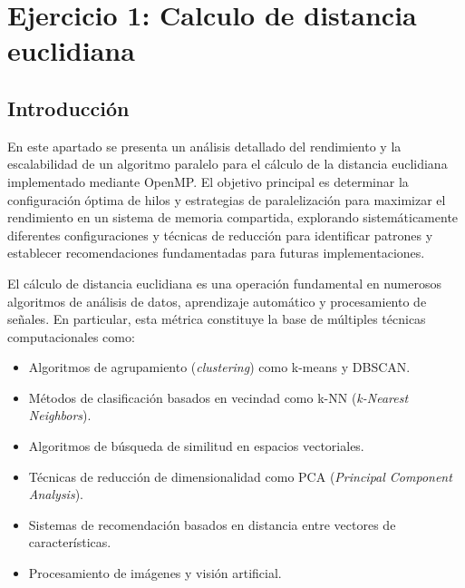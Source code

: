 \chapter{Ejercicio 1: Calculo de distancia euclidiana}

\section{Introducción}

    En este apartado se presenta un análisis detallado del rendimiento y la escalabilidad de un algoritmo paralelo para el cálculo de la distancia euclidiana implementado mediante OpenMP. El objetivo principal es determinar la configuración óptima de hilos y estrategias de paralelización para maximizar el rendimiento en un sistema de memoria compartida, explorando sistemáticamente diferentes configuraciones y técnicas de reducción para identificar patrones y establecer recomendaciones fundamentadas para futuras implementaciones.
    
    El cálculo de distancia euclidiana es una operación fundamental en numerosos algoritmos de análisis de datos, aprendizaje automático y procesamiento de señales. En particular, esta métrica constituye la base de múltiples técnicas computacionales como:
    
    \begin{itemize}
    
        \item Algoritmos de agrupamiento (\textit{clustering}) como k-means y DBSCAN.
        
        \item Métodos de clasificación basados en vecindad como k-NN (\textit{k-Nearest Neighbors}).
        
        \item Algoritmos de búsqueda de similitud en espacios vectoriales.
        
        \item Técnicas de reducción de dimensionalidad como PCA (\textit{Principal Component Analysis}).
        
        \item Sistemas de recomendación basados en distancia entre vectores de características.
        
        \item Procesamiento de imágenes y visión artificial.
        
    \end{itemize}
    
